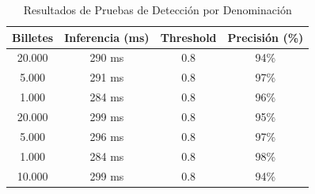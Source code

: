 \begin{table}[H]
\centering
\caption{Resultados de Pruebas de Detección por Denominación}
\label{tab:rendimiento_deteccion}
\begin{tabular}{cccc}
\toprule
\textbf{Billetes} & \textbf{Inferencia (ms)} & \textbf{Threshold} & \textbf{Precisión (\%)} \\
\midrule
20.000 & 290 ms & 0.8 & 94\% \\
5.000  & 291 ms & 0.8 & 97\% \\
1.000  & 284 ms & 0.8 & 96\% \\
20.000 & 299 ms & 0.8 & 95\% \\
5.000  & 296 ms & 0.8 & 97\% \\
1.000  & 284 ms & 0.8 & 98\% \\
10.000 & 299 ms & 0.8 & 94\% \\
\bottomrule
\end{tabular}
\end{table}